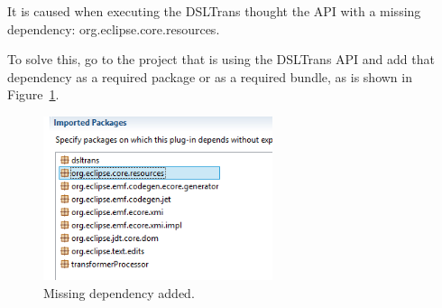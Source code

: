 It is caused when executing the DSLTrans thought the API with a missing dependency: org.eclipse.core.resources.

To solve this, go to the project that is using the DSLTrans API and add that dependency as a required package or as a required bundle, as is shown in Figure~\ref{fig:required_package_resources}.

\begin{figure}[h]
\begin{center}
  \includegraphics[width=0.6\textwidth]{imgs/required_package_resources.png}
  \caption{Missing dependency added.}
  \label{fig:required_package_resources}
\end{center}
\end{figure}





